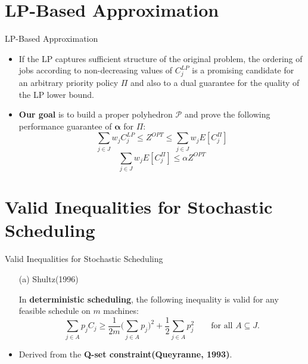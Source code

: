 \documentclass{beamer}
\begin{document}
\section{LP-Based Approximation}
\begin{frame}{LP-Based Approximation}
    \begin{itemize}
        \justifying
        \item If the LP captures sufficient structure of the original problem, the ordering of jobs according to non-decreasing values of $C_j^{LP}$ is a promising candidate for an arbitrary priority policy $\Pi$ and also to a dual guarantee for the quality of the LP lower bound.
        \vspace{0.2cm}
        \item \textbf{Our goal} is to build a proper polyhedron $\pmb{\mathscr{P}}$ and prove the following performance guarantee of $\pmb{\alpha}$ for $\Pi$:
        \vspace{0.2cm}
        \begin{equation}
            \sum\limits_{j\in J}w_jC_j^{LP} \leq Z^{OPT} \leq \sum\limits_{j\in J}w_jE[C_j^{\Pi}]
        \end{equation}
        \begin{equation}
            \sum\limits_{j\in J}w_jE[C_j^{\Pi}] \leq \alpha Z^{OPT} 
        \end{equation}
    \end{itemize}
\end{frame}

\section{Valid Inequalities for Stochastic Scheduling}
\begin{frame}{Valid Inequalities for Stochastic Scheduling}
    \begin{itemize}
        \justifying    
        \item[(a)] Shultz(1996) 
        \item[] In \textbf{deterministic scheduling}, the following inequality is valid for any feasible schedule on $m$ machines:
        \vspace{0.8cm}
        \begin{equation}
        \sum\limits_{j\in A}p_jC_j \geq \frac{1}{2m} \Bigg(  \sum\limits_{j\in A}p_j\Bigg)^2 + \frac{1}{2} \sum\limits_{j\in A}p_j^2 \qquad \text{for all } A \subseteq J.  
        \end{equation}
        \vspace{0.8cm}
        \item Derived from the \textbf{Q-set constraint(Queyranne, 1993)}.
    \end{itemize}
\end{frame}
\end{document}
